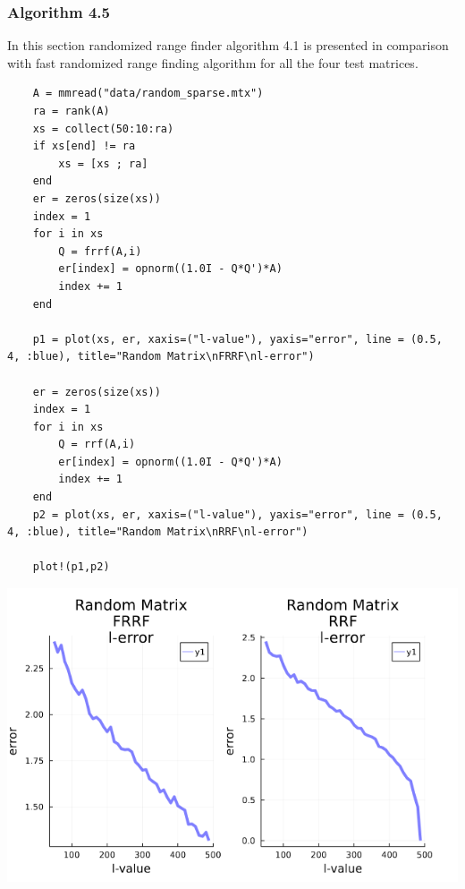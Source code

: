 \documentclass[11pt,a4paper]{article}
\theoremstyle{definition}
\begin{document}
	\subsubsection{Algorithm 4.5}
	In this section randomized range finder algorithm 4.1 is presented in comparison with fast randomized range finding algorithm for all the four test matrices.

	\begin{lstlisting}
	A = mmread("data/random_sparse.mtx")
	ra = rank(A)
	xs = collect(50:10:ra)
	if xs[end] != ra
	    xs = [xs ; ra]
	end
	er = zeros(size(xs))
	index = 1
	for i in xs 
	    Q = frrf(A,i)
	    er[index] = opnorm((1.0I - Q*Q')*A)
	    index += 1
	end
	
	p1 = plot(xs, er, xaxis=("l-value"), yaxis="error", line = (0.5, 4, :blue), title="Random Matrix\nFRRF\nl-error")
	
	er = zeros(size(xs))
	index = 1
	for i in xs 
	    Q = rrf(A,i)
	    er[index] = opnorm((1.0I - Q*Q')*A)
	    index += 1
	end
	p2 = plot(xs, er, xaxis=("l-value"), yaxis="error", line = (0.5, 4, :blue), title="Random Matrix\nRRF\nl-error")
	
	plot!(p1,p2)
	\end{lstlisting}
	\includegraphics[scale=0.5]{images/4.5_1.png}
\end{document}
